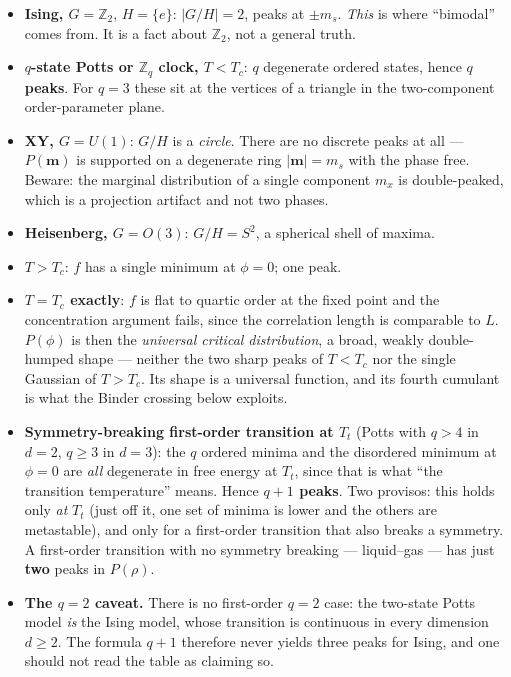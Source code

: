 \documentclass[10pt,a4paper]{article}
\theoremstyle{remark}
\begin{document}
\begin{itemize}
\item \textbf{Ising, $G=\mathbb{Z}_2$}, $H=\{e\}$: $|G/H|=2$, peaks at $\pm m_s$.
\emph{This} is where ``bimodal'' comes from. It is a fact about
$\mathbb{Z}_2$, not a general truth.
\item \textbf{$q$-state Potts or $\mathbb{Z}_q$ clock, $T<T_c$}: $q$ degenerate
ordered states, hence \textbf{$q$ peaks}. For $q=3$ these sit at the vertices of
a triangle in the two-component order-parameter plane.
\item \textbf{XY, $G=U(1)$}: $G/H$ is a \emph{circle}. There are no discrete
peaks at all --- $P(\mathbf{m})$ is supported on a degenerate ring
$|\mathbf{m}|=m_s$ with the phase free. Beware: the marginal distribution of a
single component $m_x$ is double-peaked, which is a projection artifact and not
two phases.
\item \textbf{Heisenberg, $G=O(3)$}: $G/H=S^{2}$, a spherical shell of maxima.
\item \textbf{$T>T_c$}: $f$ has a single minimum at $\phi=0$; one peak.
\item \textbf{$T=T_c$ exactly}: $f$ is flat to quartic order at the fixed point
and the concentration argument fails, since the correlation length is comparable
to $L$. $P(\phi)$ is then the \emph{universal critical distribution}, a broad,
weakly double-humped shape --- neither the two sharp peaks of $T<T_c$ nor the
single Gaussian of $T>T_c$. Its shape is a universal function, and its fourth
cumulant is what the Binder crossing below exploits.
\item \textbf{Symmetry-breaking first-order transition at $T_t$} (Potts with
$q>4$ in $d=2$, $q\geq3$ in $d=3$): the $q$ ordered minima and the disordered
minimum at $\phi=0$ are \emph{all} degenerate in free energy at $T_t$, since that
is what ``the transition temperature'' means. Hence \textbf{$q+1$ peaks}. Two
provisos: this holds only \emph{at} $T_t$ (just off it, one set of minima is
lower and the others are metastable), and only for a first-order transition that
also breaks a symmetry. A first-order transition with no symmetry breaking ---
liquid--gas --- has just \textbf{two} peaks in $P(\rho)$.
\item \textbf{The $q=2$ caveat.} There is no first-order $q=2$ case: the
two-state Potts model \emph{is} the Ising model, whose transition is continuous in
every dimension $d\geq2$. The formula $q+1$ therefore never yields three peaks
for Ising, and one should not read the table as claiming so.
\end{itemize}
\end{document}
